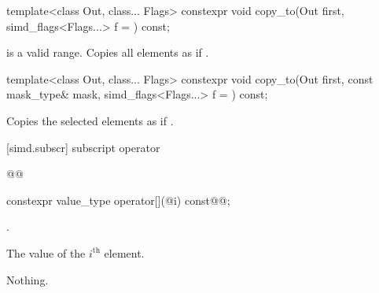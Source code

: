\begin{itemdecl}
template<class Out, class... Flags>
  constexpr void copy_to(Out first, simd_flags<Flags...> f = {}) const;
\end{itemdecl}

\begin{itemdescr}
  \SimdStoreDescr
    {\tcode{[first, first + size())} is a valid range.}
    {Copies all  elements as if  \foralli.}
\end{itemdescr}

\begin{itemdecl}
template<class Out, class... Flags>
  constexpr void copy_to(Out first, const mask_type& mask, simd_flags<Flags...> f = {}) const;
\end{itemdecl}

\begin{itemdescr}
  \SimdStoreDescr
    {\validMaskedRange}
    {Copies the selected elements as if  \forallmaskedi.}
\end{itemdescr}

[simd.subscr]{ subscript operator\texorpdfstring{}{s}}

\begin{wgBRem}
\begin{itemdecl}
@@
\end{itemdecl}

\begin{itemdescr}
  \pnum{}

  \pnum{}

  \pnum{}
\end{itemdescr}
\end{wgBRem}

\begin{itemdecl}
constexpr value_type operator[](@\simdsizetype@ i) const@\wgRem{\&}@;
\end{itemdecl}

\begin{itemdescr}
  \pnum\expects
  .

  \pnum\returns
  The value of the $i^\text{th}$ element.

  \pnum\throws Nothing.
\end{itemdescr}

